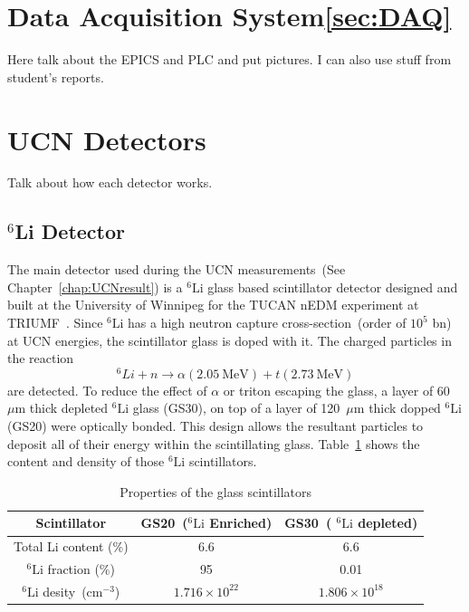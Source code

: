 



\section{Data Acquisition System\ref{sec:DAQ}}
Here talk about the EPICS and PLC and put pictures. I can also use
stuff from student's reports.

\section{UCN Detectors\label{sec:detectors}}
Talk about how each detector works.
\subsection{$^6$Li Detector\label{sec:Li6detector}}
The main detector used during the UCN measurements~(See
Chapter~\ref{chap:UCNresult}) is a $^6\mathrm{Li}$ glass based scintillator
detector designed and built at the University of Winnipeg for the
TUCAN nEDM experiment at
TRIUMF~\cite{jamieson2017characterization}. Since $^6\mathrm{Li}$ has a high
neutron capture cross-section~(order of $10^5$ bn) at UCN energies,
the scintillator glass is doped with it. The charged particles in the
reaction
\begin{equation}
^6Li + n \rightarrow \alpha (2.05~\mathrm{MeV}) + t (2.73~\mathrm{MeV})
\end{equation}
are detected. To reduce the effect of $\alpha$ or triton escaping the
glass, a layer of 60~$\mu$m thick depleted $^6\mathrm{Li}$ glass (GS30), on top
of a layer of 120~$\mu$m thick dopped $^6\mathrm{Li}$ (GS20) were optically
bonded. This design allows the resultant particles to deposit all of
their energy within the scintillating
glass. Table~\ref{tab:scintillator} shows the content and density of
those $^6\mathrm{Li}$ scintillators.

\begin{table}[h!]
  \centering
  \label{tab:scintillator}
  \begin{tabular}{|c|c|c|}
    \hline
    Scintillator & GS20~($^6\mathrm{Li}$ Enriched) & GS30~( $^6\mathrm{Li}$ depleted) \\
    \hline
    Total Li content (\%) & 6.6 & 6.6 \\
    \hline
    $^6\mathrm{Li}$ fraction (\%) & 95 & 0.01 \\
    \hline
    $^6\mathrm{Li}$ desity~(cm$^{-3}$) & $1.716 \times 10^{22}$ & $1.806 \times 10^{18}$ \\
    \hline
  \end{tabular}
  \caption{Properties of the glass scintillators}
\end{table}


